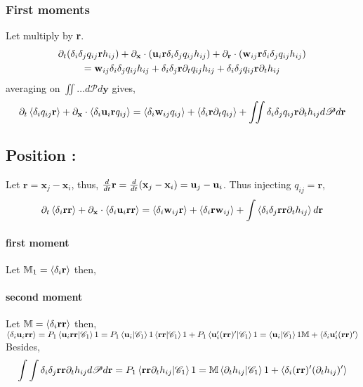 \subsubsection*{First moments}
Let multiply by \textbf{r}. 
\begin{multline*}
      \partial_t (\delta_i\delta_{j}q_{ij}\textbf{r}h_{ij}) 
    + \partial_\textbf{x} \cdot (\textbf{u}_i \textbf{r}\delta_i\delta_{j}q_{ij}h_{ij})
    + \partial_\textbf{r} \cdot (\textbf{w}_{ij} \textbf{r}\delta_i\delta_{j}q_{ij}h_{ij}) \\
    =  \textbf{w}_{ij} \delta_i\delta_{j}q_{ij}h_{ij}
    + \delta_i\delta_{j}\textbf{r}\partial_t q_{ij}h_{ij} 
    + \delta_i\delta_{j}q_{ij}\textbf{r}\partial_t h_{ij} 
\end{multline*}
averaging on $\iint \ldots d\mathscr{P}d\textbf{y}$ gives, 
\begin{equation*}
      \partial_t \left<\delta_iq_{ij}\textbf{r}\right> 
    + \partial_\textbf{x} \cdot \left<\delta_i\textbf{u}_i \textbf{r}q_{ij}\right>
    = \left<\delta_i\textbf{w}_{ij}q_{ij}\right>
    + \left<\delta_i\textbf{r}\partial_t q_{ij}\right> 
    + \iint\delta_i\delta_{j}q_{ij}\textbf{r}\partial_t h_{ij} d\mathscr{P}d\textbf{r}
\end{equation*}
\subsection*{Position :}
Let $\textbf{r} = \textbf{x}_j - \textbf{x}_i$, thus, 
$\frac{d}{d t} \textbf{r} = \frac{d}{d t} (\textbf{x}_j - \textbf{x}_i) = \textbf{u}_j - \textbf{u}_i$. 
Thus injecting $q_{ij} =\textbf{r}$, 
\begin{equation*}
    \partial_t \left<\delta_i \textbf{r}\textbf{r}\right> 
  + \partial_\textbf{x} \cdot \left<\delta_i\textbf{u}_i \textbf{r} \textbf{r}\right>
  = \left<\delta_i\textbf{w}_{ij} \textbf{r}\right>
  + \left<\delta_i\textbf{r} \textbf{w}_{ij}\right> 
  + \int \left<\delta_i\delta_{j} \textbf{r}\textbf{r}\partial_t h_{ij} \right> d\textbf{r}
\end{equation*}
\paragraph*{first moment}
Let $\mathbb{M}_1 = \left<\delta_i \textbf{r}\right>$ then, 
\paragraph*{second moment}
Let $\mathbb{M} = \left<\delta_i \textbf{r}\textbf{r}\right>$ then, 
$\left<\delta_i\textbf{u}_i \textbf{r} \textbf{r}\right> 
= P_1\left<\textbf{u}_i \textbf{r} \textbf{r} | \mathscr{C}_1\right>{1} 
= P_1\left<\textbf{u}_i | \mathscr{C}_1\right>{1} \left<\textbf{r} \textbf{r} | \mathscr{C}_1\right>{1} 
+ P_1\left<\textbf{u}_i' (\textbf{r} \textbf{r})' | \mathscr{C}_1\right>{1}
=\left<\textbf{u}_i | \mathscr{C}_1\right>{1} \mathbb{M} 
+ \left<\delta_i\textbf{u}_i' (\textbf{r} \textbf{r})'\right>$
Besides, 
\begin{equation*}
    \int \int\delta_i\delta_{j} \textbf{r}\textbf{r}\partial_t h_{ij} d\mathscr{P} d\textbf{r}
    =P_1\left<\textbf{r}\textbf{r}\partial_t h_{ij} | \mathscr{C}_1\right>{1}
    = \mathbb{M}\left<\partial_t h_{ij} | \mathscr{C}_1\right>{1}
    +\left<\delta_i(\textbf{r}\textbf{r})'(\partial_t h_{ij})'\right>
\end{equation*}


